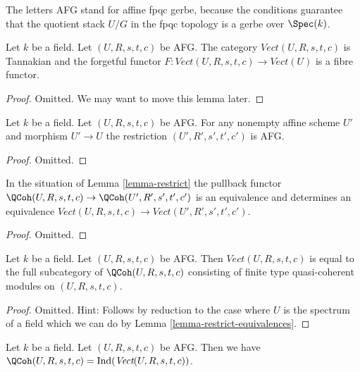 \noindent
The letters AFG stand for affine fpqc gerbe, because the conditions guarantee
that the quotient stack $U/G$ in the fpqc topology is a gerbe over $\Spec(k)$.

\begin{lemma}
\label{lemma-vector-bundles-on-groupoid}
Let $k$ be a field. Let $(U, R, s, t, c)$ be AFG. The category
$\textit{Vect}(U, R, s, t, c)$ is Tannakian and the forgetful
functor $F : \textit{Vect}(U, R, s, t, c) \to \textit{Vect}(U)$
is a fibre functor.
\end{lemma}

\begin{proof}
Omitted. We may want to move this lemma later.
\end{proof}

\begin{lemma}
\label{lemma-restrict}
Let $k$ be a field. Let $(U, R, s, t, c)$ be AFG.
For any nonempty affine scheme $U'$ and morphism $U' \to U$ the
restriction $(U', R', s', t', c')$ is AFG.
\end{lemma}

\begin{proof}
Omitted.
\end{proof}

\begin{lemma}
\label{lemma-restrict-equivalences}
In the situation of Lemma \ref{lemma-restrict} the pullback functor
$\QCoh(U, R, s, t, c) \to \QCoh(U', R', s', t', c')$ is an equivalence
and determines an equivalence
$\textit{Vect}(U, R, s, t, c) \to \textit{Vect}(U', R', s', t', c')$.
\end{lemma}

\begin{proof}
Omitted.
\end{proof}

\begin{lemma}
\label{lemma-vect-is-ft-qcoh}
Let $k$ be a field. Let $(U, R, s, t, c)$ be AFG.
Then $\textit{Vect}(U, R, s, t, c)$ is equal to the
full subcategory of $\QCoh(U, R, s, t, c)$ consisting of
finite type quasi-coherent modules on $(U, R, s, t, c)$.
\end{lemma}

\begin{proof}
Omitted. Hint:
Follows by reduction to the case where $U$ is the spectrum of
a field which we can do by Lemma \ref{lemma-restrict-equivalences}.
\end{proof}

\begin{lemma}
\label{lemma-colimit}
Let $k$ be a field. Let $(U, R, s, t, c)$ be AFG.
Then we have
$\QCoh(U, R, s, t, c) = \text{Ind}(\textit{Vect}(U, R, s, t, c))$.
\end{lemma}

